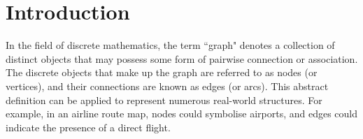 


\pagestyle{fancy} %


\chapter{Introduction} %

\label{chap:ntroduction} %




In the field of discrete mathematics, the term ``graph" denotes a collection of distinct objects that may possess some form of pairwise connection or association. The discrete objects that make up the graph are referred to as nodes (or vertices), and their connections are known as edges (or arcs). This abstract definition can be applied to represent numerous real-world structures. For example, in an airline route map, nodes could symbolise airports, and edges could indicate the presence of a direct flight.

\vspace{0.1cm}

